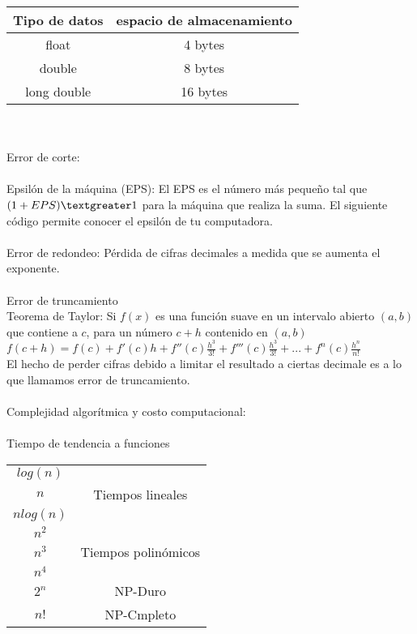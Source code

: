 \begin{tabular}{| c | c |}
\hline
Tipo de datos & espacio de almacenamiento\\
\hline 
float& 4 bytes\\
double & 8 bytes\\
long double & 16 bytes\\
\hline
\end{tabular}
\\ \\
Error de corte:
\\ \\
Epsil\'on de la m\'aquina (EPS): El EPS es el n\'umero m\'as pequeño tal que $(1+EPS)\textgreater1$ para la m\'aquina que realiza la suma.
El siguiente c\'odigo permite conocer el epsil\'on de tu computadora.
\\ \\
Error de redondeo: P\'erdida de cifras decimales a medida que se aumenta el exponente.
\\ \\
Error de truncamiento \\
Teorema de Taylor: Si $f(x)$ es una funci\'on suave en un intervalo abierto $(a,b)$ que contiene a $c$, para un n\'umero $c+h$ contenido en $(a,b)$ \\
$f(c+h)=f(c)+f'(c)h+f''(c)\frac{h^3}{3!}+f'''(c)\frac{h^3}{3!}+...+f^n(c)\frac{h^n}{n!}$ \\
El hecho de perder cifras debido a limitar el resultado a ciertas decimale es a lo que llamamos error de truncamiento.
\\ \\
Complejidad algor\'itmica y costo computacional:
\\ \\ 
Tiempo de tendencia a funciones\\
\begin{tabular}{| c | c |}
\hline
$log(n)$ & \\
$n$ & Tiempos lineales \\ 
$nlog(n)$ & \\
\hline
$n^2$ & \\
$n^3$ & Tiempos polin\'omicos \\ 
$n^4$ & \\
\hline
$2^n$ & NP-Duro \\
$n!$ & NP-Cmpleto\\
\hline
\end{tabular}
